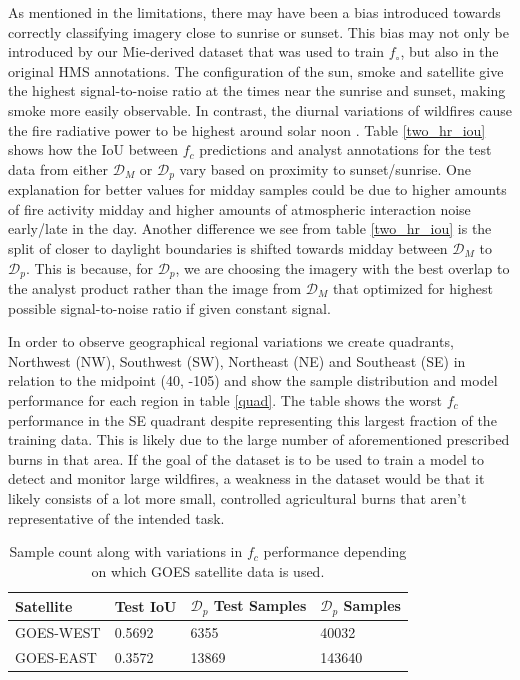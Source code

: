 \documentclass{article}
\begin{document}
As mentioned in the limitations, there may have been a bias introduced towards correctly classifying imagery close to sunrise or sunset. This bias may not only be introduced by our Mie-derived dataset that was used to train \(f_{\circ}\), but also in the original HMS annotations. The configuration of the sun, smoke and satellite give the highest signal-to-noise ratio at the times near the sunrise and sunset, making smoke more easily observable. In contrast, the diurnal variations of wildfires cause the fire radiative power to be highest around solar noon \cite{diurnal}. Table \ref{two_hr_iou} shows how the IoU between \(f_c\) predictions and analyst annotations for the test data from either \(\mathcal{D}_M\) or \(\mathcal{D}_p\) vary based on proximity to sunset/sunrise. One explanation for better values for midday samples could be due to higher amounts of fire activity midday and higher amounts of atmospheric interaction noise early/late in the day. Another difference we see from table \ref{two_hr_iou} is the split of closer to daylight boundaries is shifted towards midday between \(\mathcal{D}_M\) to \(\mathcal{D}_p\). This is because, for \(\mathcal{D}_p\), we are choosing the imagery with the best overlap to the analyst product rather than the image from \(\mathcal{D}_M\) that optimized for highest possible signal-to-noise ratio if given constant signal.

In order to observe geographical regional variations we create quadrants, Northwest (NW), Southwest (SW), Northeast (NE) and Southeast (SE) in relation to the midpoint (40, -105) and show the sample distribution and model performance for each region in table \ref{quad}. The table shows the worst \(f_c\) performance in the SE quadrant despite representing this largest fraction of the training data. This is likely due to the large number of aforementioned prescribed burns in that area. If the goal of the dataset is to be used to train a model to detect and monitor large wildfires, a weakness in the dataset would be that it likely consists of a lot more small, controlled agricultural burns that aren't representative of the intended task. 


\begin{table}
    \caption{Sample count along with variations in \(f_c\) performance depending on which GOES satellite data is used.}
  \label{sample_count_sat}
  \centering
  \begin{tabular}{llll}
    \toprule
    Satellite & Test IoU & \(\mathcal{D}_p\) Test Samples & \(\mathcal{D}_p\) Samples \\
    \midrule
    GOES-WEST & 0.5692 & 6355 & 40032\\
    GOES-EAST & 0.3572 & 13869 & 143640\\
    \bottomrule
  \end{tabular}
\end{table}
\end{document}
